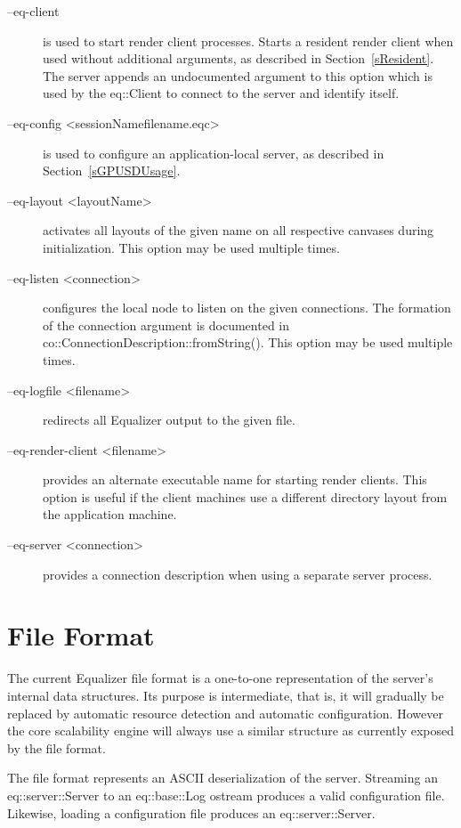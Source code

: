 \documentclass[10pt,a4]{scrartcl}
\newcommand{\sref}[1]{Section~\ref{#1}}
\begin{document}
\begin{description}
\item[--eq-client] is used to start render client processes. Starts a resident
  render client when used without additional arguments, as described in
  \sref{sResident}. The server appends an undocumented argument to this option
  which is used by the \textsf{eq::Client} to connect to the server and identify
  itself.
\item[--eq-config \textless sessionName\textbar filename.eqc\textgreater] is
  used to configure an application-local server, as described in
  \sref{sGPUSDUsage}.
\item[--eq-layout \textless layoutName\textgreater] activates all layouts of the
  given name on all respective canvases during initialization. This option may
  be used multiple times.
\item[--eq-listen \textless connection\textgreater] configures the
  local node to listen on the given connections. The formation of the connection
  argument is documented in
  \textsf{co::Con\-nec\-tionDescription::fromString()}. This option may be used
  multiple times.
\item[--eq-logfile \textless filename\textgreater] redirects all Equalizer
  output to the given file.
\item[--eq-render-client \textless filename\textgreater] provides an alternate
  executable name for starting render clients. This option is useful if the
  client machines use a different directory layout from the application machine.
\item[--eq-server \textless connection\textgreater] provides a connection
  description when using a separate server process.
\end{description}

\section{\label{aFileFormat}File Format}

The current Equalizer file format is a one-to-one representation of the
server's internal data structures. Its purpose is intermediate, that is,
it will gradually be replaced by automatic resource detection and
automatic configuration. However the core scalability engine will always
use a similar structure as currently exposed by the file format.

The file format represents an ASCII deserialization of the
server. Streaming an \textsf{eq::server::Server} to an \textsf{eq::base::Log}
ostream produces a valid configuration file. Likewise, loading a
configuration file produces an \textsf{eq::server::Server}.
\end{document}
